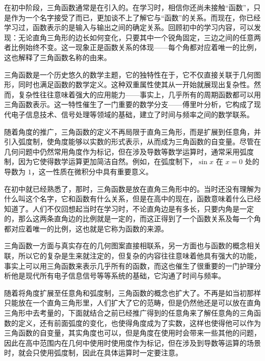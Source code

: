 \begin{issues}
\issueDraft
\end{issues}

在初中阶段，三角函数通常是在引入的。在学习时，相信你还尚未接触“函数”，只是作为一个名字接受了而已，更加谈不上了解它与“函数”的关系。而现在，你已经学习过，函数表示的是输入与输出之间的确定关系。回顾初中的学习内容，可以发现：无论直角三角形的边长如何变化，只要其中一个锐角固定，三边之间的任意两者比例始终不变。这一现象正是函数关系的体现——每个角都对应着唯一的比例，这也解释了三角函数名称的由来。

三角函数是一个历史悠久的数学主题，它的独特性在于，它不仅直接关联于几何图形，同时也满足函数的数学定义。这种双重属性使其从一开始就展现出复杂性。然而，复杂性往往意味着强大的应用能力——事实上，几乎所有的周期函数都可以用三角函数表示。这一特性催生了一门重要的数学分支——傅里叶分析，它构成了现代电子信息技术、信号处理等领域的基础，建立了时间与频率之间的数学联系。

随着角度的推广，三角函数的定义不再局限于直角三角形，而是扩展到任意角，并引入弧度制，使角度能够以实数的形式表示，从而成为三角函数的自变量。尽管在几何问题中仍然常用角度作为标记，但在涉及导数等数学运算时，通常采用弧度制，因为它使得数学运算更加简洁自然。例如，在弧度制下，$\sin x$ 在 $x=0$ 处的导数为 $1$，这一性质在微积分中具有重要意义。


在初中就已经熟悉了，那时，三角函数是放在直角三角形中的。当时还没有理解为什么叫这个名字，它和函数有什么关系，但是在高中的现在，函数意味着什么已经知道了。人们不仅回想起当时在学习时，不论直角边是有多长，只要内角是一定的，那么这两条直角边的比例就是一定的，而这正得到了一个函数关系及每一个角都对应着唯一的比例，这也就是它称为函数的来源。

三角函数一方面与真实存在的几何图案直接相联系，另一方面也与函数的概念相关联，所以它的复杂是生来就注定的，但复杂的内容往往意味着他具有强大的功能，事实上可以用三角函数来表示几乎所有的函数，而这也催生了很重要的一门护理分析他是现代所有电子信息信号等等系统的基础，它沟通了时间与频率。

随着将角度扩展至任意角和弧度制，三角函数的概念也扩大了。不再是如当初那样只能放在一个直角三角形里，人们扩大了它的范畴，但是仍然他还是可以放在直角三角形中去考量的，下面就结合之前已经推广得到的任意角来了解任意角的三角函数的定义，还有前面弧度的变化，也使得角度成为了实数，这样也使得他可以作为三角函数的自变量，其实角度也可以，但是角度在使用时会带来一些其他的问题，因此在高中范围内在几何中使用时使用度作为标记，但在涉及到导数等运算的场景时，就会只使用弧度制，因此在具体运算时一定要注意。

